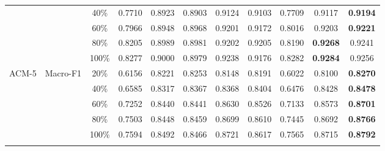 \begin{table*}[t]
\begin{tabular}{|c|c|c|c|c|c|c|c|c|c|c|}
                        &                           & 40\%                        & 0.7710               & 0.8923               & 0.8903               & 0.9124                & 0.9103               & 0.7709                  & 0.9117               & \textbf{0.9194}       \\  
                        &                           & 60\%                        & 0.7966               & 0.8948               & 0.8968               & 0.9201                & 0.9172               & 0.8016                  & 0.9203               & \textbf{0.9221}       \\  
                        &                           & 80\%                        & 0.8205               & 0.8989               & 0.8981               & 0.9202                & 0.9205               & 0.8190                  & \textbf{0.9268}      & 0.9241                \\  
                        &                           & 100\%                       & 0.8277               & 0.9000               & 0.8979               & 0.9238                & 0.9176               & 0.8282                  & \textbf{0.9284}      & 0.9256                \\ \hline
\multirow{10}{*}{ACM-5} & \multirow{5}{*}{Macro-F1} & 20\%                        & 0.6156               & 0.8221               & 0.8253               & 0.8148                & 0.8191               & 0.6022                  & 0.8100               & \textbf{0.8270}       \\  
                        &                           & 40\%                        & 0.6585               & 0.8317               & 0.8367               & 0.8368                & 0.8404               & 0.6476                  & 0.8428               & \textbf{0.8478}       \\  
                        &                           & 60\%                        & 0.7252               & 0.8440               & 0.8441               & 0.8630                & 0.8526               & 0.7133                  & 0.8573               & \textbf{0.8701}       \\  
                        &                           & 80\%                        & 0.7503               & 0.8448               & 0.8459               & 0.8699                & 0.8610               & 0.7445                  & 0.8692               & \textbf{0.8766}       \\  
                        &                           & 100\%                       & 0.7594               & 0.8492               & 0.8466               & 0.8721                & 0.8617               & 0.7565                  & 0.8715               & \textbf{0.8792}       \\ \cline{2-11} 

\end{tabular}
\end{table*}
